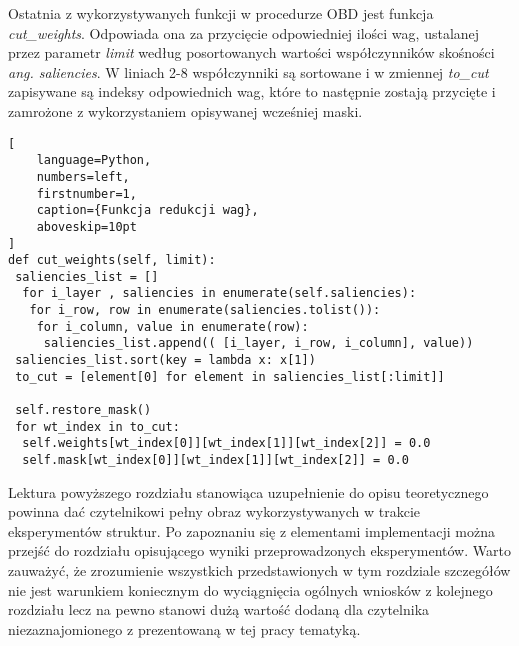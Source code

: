 \par Ostatnia z wykorzystywanych funkcji w procedurze OBD jest funkcja \emph{cut{\_}weights}. Odpowiada ona za przycięcie odpowiedniej ilości wag, ustalanej przez parametr \emph{limit} według posortowanych wartości współczynników skośności \emph{ang. saliencies}. W liniach 2-8 współczynniki są sortowane i w zmiennej \emph{to{\_}cut} zapisywane są indeksy odpowiednich wag, które to następnie zostają przycięte i zamrożone z wykorzystaniem opisywanej wcześniej maski.
\begin{addmargin}[10mm]{0mm}
\begin{lstlisting}[
    language=Python,
    numbers=left,
    firstnumber=1,
    caption={Funkcja redukcji wag},
    aboveskip=10pt
]
def cut_weights(self, limit):
 saliencies_list = []
  for i_layer , saliencies in enumerate(self.saliencies):
   for i_row, row in enumerate(saliencies.tolist()):
    for i_column, value in enumerate(row):
     saliencies_list.append(( [i_layer, i_row, i_column], value))                    
 saliencies_list.sort(key = lambda x: x[1])
 to_cut = [element[0] for element in saliencies_list[:limit]]
 
 self.restore_mask()
 for wt_index in to_cut:
  self.weights[wt_index[0]][wt_index[1]][wt_index[2]] = 0.0
  self.mask[wt_index[0]][wt_index[1]][wt_index[2]] = 0.0
\end{lstlisting}
\end{addmargin}

\vspace{10mm}
\par Lektura powyższego rozdziału stanowiąca uzupełnienie do opisu teoretycznego powinna dać czytelnikowi pełny obraz wykorzystywanych w trakcie eksperymentów struktur. Po zapoznaniu się z elementami implementacji można przejść do rozdziału opisującego wyniki przeprowadzonych eksperymentów. Warto zauważyć, że zrozumienie wszystkich przedstawionych w tym rozdziale szczegółów nie jest warunkiem koniecznym do wyciągnięcia ogólnych wniosków z kolejnego rozdziału lecz na pewno stanowi dużą wartość dodaną dla czytelnika niezaznajomionego z prezentowaną w tej pracy tematyką. 